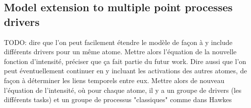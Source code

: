 \subsection{Model extension to multiple point processes drivers}

TODO: dire que l'on peut facilement étendre le modèle de façon à y include différents drivers pour un même atome. Mettre alors l'équation de la nouvelle fonction d'intensité, préciser que ça fait partie du futur work. Dire aussi que l'on peut éventuellement continuer en y incluant les activations des autres atomes, de façon à déterminer les liens temporels entre eux. Mettre alors de nouveau l'équation de l'intensité, où pour chaque atome, il y a un groupe de drivers (les différents tasks) et un groupe de processus "classiques" comme dans Hawkes